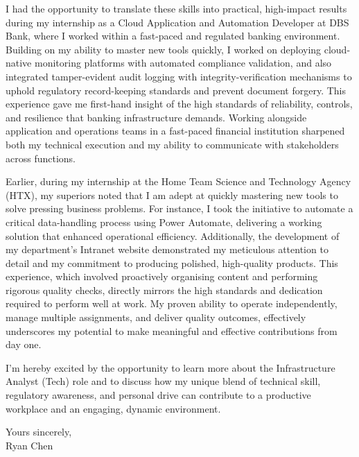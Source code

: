 \documentclass[11pt, a4paper]{article}
\begin{document}
\noindent
I had the opportunity to translate these skills into practical, high-impact results during my internship as a Cloud Application and Automation Developer at DBS Bank, where I worked within a fast-paced and regulated banking environment. Building on my ability to master new tools quickly, I worked on deploying cloud-native monitoring platforms with automated compliance validation, and also integrated tamper-evident audit logging with integrity-verification mechanisms to uphold regulatory record-keeping standards and prevent document forgery. This experience gave me first-hand insight of the high standards of reliability, controls, and resilience that banking infrastructure demands. Working alongside application and operations teams in a fast-paced financial institution sharpened both my technical execution and my ability to communicate with stakeholders across functions.

\vspace{5mm}

\noindent
Earlier, during my internship at the Home Team Science and Technology Agency (HTX), my superiors noted that I am adept at quickly mastering new tools to solve pressing business problems. For instance, I took the initiative to automate a critical data-handling process using Power Automate, delivering a working solution that enhanced operational efficiency. Additionally, the development of my department's Intranet website demonstrated my meticulous attention to detail and my commitment to producing polished, high-quality products. This experience, which involved proactively organising content and performing rigorous quality checks, directly mirrors the high standards and dedication required to perform well at work. My proven ability to operate independently, manage multiple assignments, and deliver quality outcomes, effectively underscores my potential to make meaningful and effective contributions from day one.

\vspace{5mm}

\noindent
I'm hereby excited by the opportunity to learn more about the Infrastructure Analyst (Tech) role and to discuss how my unique blend of technical skill, regulatory awareness, and personal drive can contribute to a productive workplace and an engaging, dynamic environment.

\vspace{5mm}

\noindent
Yours sincerely, \\
\noindent
Ryan Chen
\end{document}
